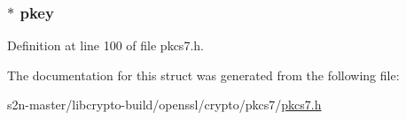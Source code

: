 \subsubsection[{\texorpdfstring{pkey}{pkey}}]{ $\ast$ pkey}\hypertarget{structpkcs7__signer__info__st_ad6e367842646f43c91845fb952047fe3}{}\label{structpkcs7__signer__info__st_ad6e367842646f43c91845fb952047fe3}


Definition at line 100 of file pkcs7.\+h.



The documentation for this struct was generated from the following file\+:\begin{DoxyCompactItemize}
\item 
s2n-\/master/libcrypto-\/build/openssl/crypto/pkcs7/\hyperlink{crypto_2pkcs7_2pkcs7_8h}{pkcs7.\+h}\end{DoxyCompactItemize}
